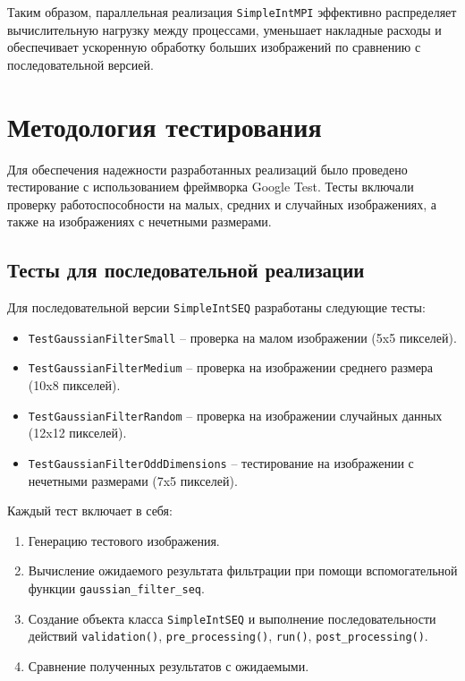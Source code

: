 \documentclass[12pt]{article}
\begin{document}
Таким образом, параллельная реализация \texttt{SimpleIntMPI} эффективно распределяет вычислительную нагрузку между процессами, уменьшает накладные расходы и обеспечивает ускоренную обработку больших изображений по сравнению с последовательной версией.


\section{Методология тестирования}

Для обеспечения надежности разработанных реализаций было проведено тестирование с использованием фреймворка Google Test. Тесты включали проверку работоспособности на малых, средних и случайных изображениях, а также на изображениях с нечетными размерами.

\subsection{Тесты для последовательной реализации}

Для последовательной версии \texttt{SimpleIntSEQ} разработаны следующие тесты:

\begin{itemize}
    \item \texttt{TestGaussianFilterSmall} – проверка на малом изображении (5x5 пикселей).
    \item \texttt{TestGaussianFilterMedium} – проверка на изображении среднего размера (10x8 пикселей).
    \   \item \texttt{TestGaussianFilterRandom} – проверка на изображении случайных данных (12x12 пикселей).
    \item \texttt{TestGaussianFilterOddDimensions} – тестирование на изображении с нечетными размерами (7x5 пикселей).
\end{itemize}

Каждый тест включает в себя:
\begin{enumerate}
    \item Генерацию тестового изображения.
    \item Вычисление ожидаемого результата фильтрации при помощи вспомогательной функции \texttt{gaussian\_filter\_seq}.
    \item Создание объекта класса \texttt{SimpleIntSEQ} и выполнение последовательности действий \texttt{validation()}, \texttt{pre\_processing()}, \texttt{run()}, \texttt{post\_processing()}.
    \item Сравнение полученных результатов с ожидаемыми.
\end{enumerate}
\end{document}
